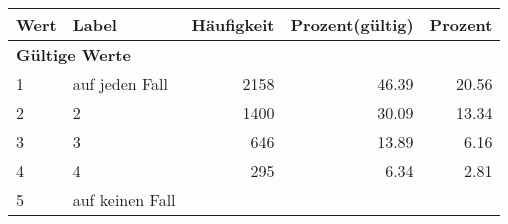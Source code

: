      \begin{longtable}{lXrrr}
     \toprule
     \textbf{Wert} & \textbf{Label} & \textbf{Häufigkeit} & \textbf{Prozent(gültig)} & \textbf{Prozent} \\
     \endhead
     \midrule
     \multicolumn{5}{l}{\textbf{Gültige Werte}}\\

     1 &
     \multicolumn{1}{X}{ auf jeden Fall   } &


       \num{2158} &
       \num[round-mode=places,round-precision=2]{46.39} &
         \num[round-mode=places,round-precision=2]{20.56} \\

     2 &
     \multicolumn{1}{X}{ 2   } &


       \num{1400} &
       \num[round-mode=places,round-precision=2]{30.09} &
         \num[round-mode=places,round-precision=2]{13.34} \\

     3 &
     \multicolumn{1}{X}{ 3   } &


       \num{646} &
       \num[round-mode=places,round-precision=2]{13.89} &
         \num[round-mode=places,round-precision=2]{6.16} \\

     4 &
     \multicolumn{1}{X}{ 4   } &


       \num{295} &
       \num[round-mode=places,round-precision=2]{6.34} &
         \num[round-mode=places,round-precision=2]{2.81} \\

     5 &
     \multicolumn{1}{X}{ auf keinen Fall   } &



\end{longtable}
